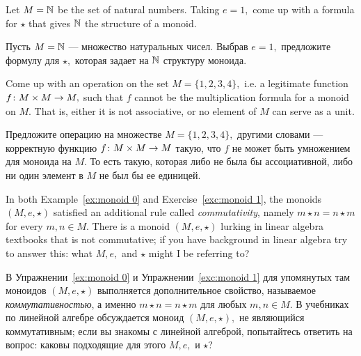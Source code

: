 \documentclass[CT4S-EN-RU]{subfiles}
\begin{document}
\begin{exerciseENG}\label{exc:monoid 1}
Let $M={\mathbb N}$ be the set of natural numbers. Taking $e=1,$ come up with a formula for $\star$ that gives ${\mathbb N}$ the structure of a monoid.
\end{exerciseENG}

\begin{exerciseRUS}\label{exc:monoid 1}
Пусть $M={\mathbb N}$ — множество натуральных чисел. Выбрав $e=1,$ предложите формулу для $\star,$ которая задает на ${\mathbb N}$ структуру моноида.
\end{exerciseRUS}

\begin{exerciseENG}
Come up with an operation on the set $M=\{1,2,3,4\},$ i.e. a legitimate function $f\colon M\times M\rightarrow M,$ such that $f$ cannot be the multiplication formula for a monoid on $M.$ That is, either it is not associative, or no element of $M$ can serve as a unit.
\end{exerciseENG}

\begin{exerciseRUS}
Предложите операцию на множестве $M=\{1,2,3,4\},$ другими словами — корректную функцию $f\colon M\times M\rightarrow M$ такую, что $f$ не может быть умножением для моноида на $M.$ То есть такую, которая либо не была бы ассоциативной, либо ни один элемент в $M$ не был бы ее единицей.
\end{exerciseRUS}

\begin{exerciseENG}\label{ex:commutative monoid}
In both Example~\ref{ex:monoid 0} and Exercise~\ref{exc:monoid 1}, the monoids $(M,e,\star)$ satisfied an additional rule called {\em commutativity}, namely $m\star n=n\star m$ for every $m,n\in M.$ There is a monoid $(M,e,\star)$ lurking in linear algebra textbooks that is not commutative; if you have background in linear algebra try to answer this: what $M, e,$ and $\star$ might I be referring to?
\end{exerciseENG}

\begin{exerciseRUS}\label{ex:commutative monoid}
В Упражнении~\ref{ex:monoid 0} и Упражнении~\ref{exc:monoid 1} для упомянутых там моноидов $(M,e,\star)$ выполняется дополнительное свойство, называемое {\em коммутативностью}, а именно $m\star n=n\star m$ для любых $m,n\in M.$ В учебниках по линейной алгебре обсуждается моноид $(M,e,\star),$ не являющийся коммутативным; если вы знакомы с линейной алгеброй, попытайтесь ответить на вопрос: каковы подходящие для этого $M, e,$ и $\star$?
\end{exerciseRUS}
\end{document}
